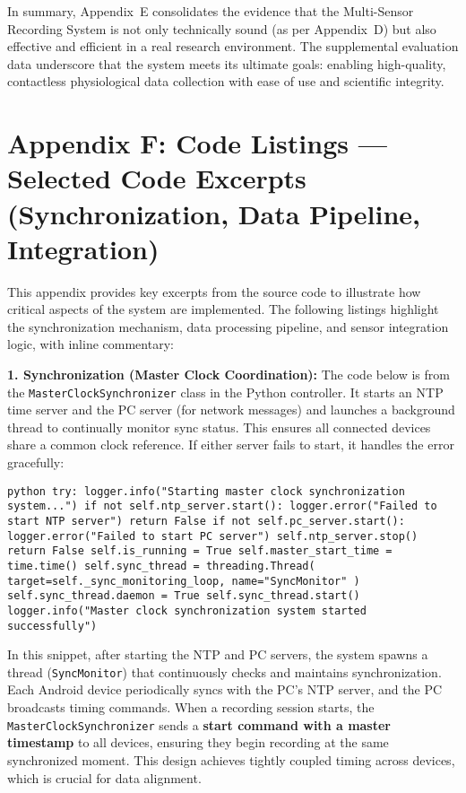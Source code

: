 {In summary, Appendix E consolidates the evidence that the Multi-Sensor
Recording System is not only technically sound (as per Appendix D) but
also effective and efficient in a real research environment. The
supplemental evaluation data underscore that the system meets its
ultimate goals: enabling high-quality, contactless physiological data
collection with ease of use and scientific integrity.

\section{Appendix F: Code Listings --- Selected Code Excerpts (Synchronization, Data Pipeline, Integration)}

This appendix provides key excerpts from the source code to illustrate
how critical aspects of the system are implemented. The following
listings highlight the synchronization mechanism, data processing
pipeline, and sensor integration logic, with inline commentary:

\textbf{1. Synchronization (Master Clock Coordination):} The code below is
from the \texttt{MasterClockSynchronizer} class in the Python controller. It
starts an NTP time server and the PC server (for network messages) and
launches a background thread to continually monitor sync status. This
ensures all connected devices share a common clock reference. If either
server fails to start, it handles the error
gracefully\cite{DeviceServer}\cite{DeviceServer}:

\texttt{python try: logger.info("Starting master clock synchronization system...") if not self.ntp_server.start(): logger.error("Failed to start NTP server") return False if not self.pc_server.start(): logger.error("Failed to start PC server") self.ntp_server.stop() return False self.is_running = True self.master_start_time = time.time() self.sync_thread = threading.Thread( target=self._sync_monitoring_loop, name="SyncMonitor" ) self.sync_thread.daemon = True self.sync_thread.start() logger.info("Master clock synchronization system started successfully")}\cite{DeviceServer}

In this snippet, after starting the NTP and PC servers, the system
spawns a thread (\texttt{SyncMonitor}) that continuously checks and maintains
synchronization. Each Android device periodically syncs with the PC's
NTP server, and the PC broadcasts timing commands. When a recording
session starts, the \texttt{MasterClockSynchronizer} sends a \textbf{start command
with a master timestamp} to all devices, ensuring they begin recording
at the same synchronized
moment\cite{DeviceServer}.
This design achieves tightly coupled timing across devices, which is
crucial for data alignment.

}
